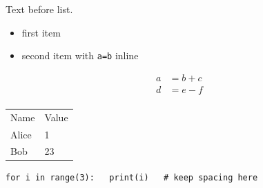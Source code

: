 Text  before list.

\begin{itemize}\item first item
\item    second item with \verb|a=b| inline
\end{itemize}

\begin{align}a&=b+c\\  d  &=e-f\\
\end{align}

\begin{tabular}{ll}Name&Value\\Alice&1\\ Bob &  23\\\end{tabular}

\begin{lstlisting}
for i in range(3):   print(i)   # keep spacing here
\end{lstlisting}
